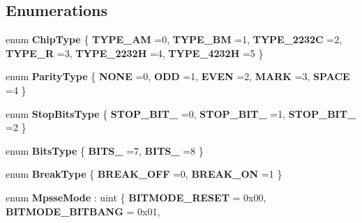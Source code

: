 \subsection*{Enumerations}
\begin{DoxyCompactItemize}
\item 
\mbox{\label{namespacelibftdinet_a82e31c4f064de87d1d2d5f7c263aaed4}} 
enum {\bfseries Chip\+Type} \{ \newline
{\bfseries T\+Y\+P\+E\+\_\+\+AM} =0, 
{\bfseries T\+Y\+P\+E\+\_\+\+BM} =1, 
{\bfseries T\+Y\+P\+E\+\_\+2232C} =2, 
{\bfseries T\+Y\+P\+E\+\_\+R} =3, 
\newline
{\bfseries T\+Y\+P\+E\+\_\+2232H} =4, 
{\bfseries T\+Y\+P\+E\+\_\+4232H} =5
 \}
\item 
\mbox{\label{namespacelibftdinet_a00a431d8f4509a12fa5942db245a888a}} 
enum {\bfseries Parity\+Type} \{ \newline
{\bfseries N\+O\+NE} =0, 
{\bfseries O\+DD} =1, 
{\bfseries E\+V\+EN} =2, 
{\bfseries M\+A\+RK} =3, 
\newline
{\bfseries S\+P\+A\+CE} =4
 \}
\item 
\mbox{\label{namespacelibftdinet_a9287e372bd61698b4cbe18b86e88df86}} 
enum {\bfseries Stop\+Bits\+Type} \{ {\bfseries S\+T\+O\+P\+\_\+\+B\+I\+T\+\_} =0, 
{\bfseries S\+T\+O\+P\+\_\+\+B\+I\+T\+\_} =1, 
{\bfseries S\+T\+O\+P\+\_\+\+B\+I\+T\+\_} =2
 \}
\item 
\mbox{\label{namespacelibftdinet_a0bf2f4dc9aeec9a5ec6ae00148843318}} 
enum {\bfseries Bits\+Type} \{ {\bfseries B\+I\+T\+S\+\_} =7, 
{\bfseries B\+I\+T\+S\+\_} =8
 \}
\item 
\mbox{\label{namespacelibftdinet_a7c8c82a8c01eac9d50a413df2073877c}} 
enum {\bfseries Break\+Type} \{ {\bfseries B\+R\+E\+A\+K\+\_\+\+O\+FF} =0, 
{\bfseries B\+R\+E\+A\+K\+\_\+\+ON} =1
 \}
\item 
\mbox{\label{namespacelibftdinet_a3d7c5c5f59ffa8b4513847972b3606bf}} 
enum {\bfseries Mpsse\+Mode} \+: uint \{ \newline
{\bfseries B\+I\+T\+M\+O\+D\+E\+\_\+\+R\+E\+S\+ET} = 0x00, 
{\bfseries B\+I\+T\+M\+O\+D\+E\+\_\+\+B\+I\+T\+B\+A\+NG} = 0x01, 

\end{DoxyCompactItemize}
